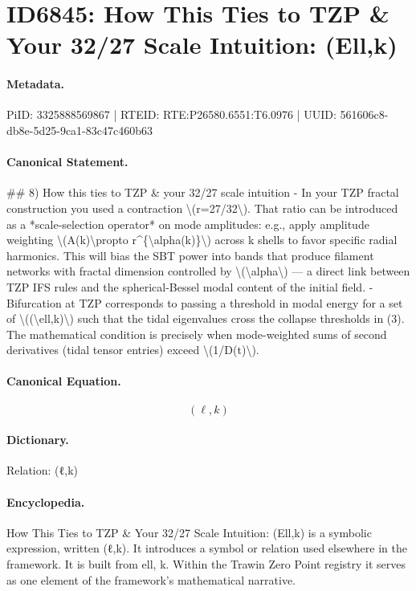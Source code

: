 \section*{ID6845: How This Ties to TZP \& Your 32/27 Scale Intuition: (Ell,k)}
\paragraph{Metadata.}
PiID: 3325888569867 | RTEID: RTE:P26580.6551:T6.0976 | UUID: 561606c8-db8e-5d25-9ca1-83c47c460b63

\paragraph{Canonical Statement.}
\#\# 8) How this ties to TZP \& your 32/27 scale intuition - In your TZP fractal construction you used a contraction \textbackslash{}(r=27/32\textbackslash{}). That ratio can be introduced as a *scale-selection operator* on mode amplitudes: e.g., apply amplitude weighting \textbackslash{}(A(k)\textbackslash{}propto r\textasciicircum{}\{\textbackslash{}alpha(k)\}\textbackslash{}) across k shells to favor specific radial harmonics. This will bias the SBT power into bands that produce filament networks with fractal dimension controlled by \textbackslash{}(\textbackslash{}alpha\textbackslash{}) — a direct link between TZP IFS rules and the spherical-Bessel modal content of the initial field. - Bifurcation at TZP corresponds to passing a threshold in modal energy for a set of \textbackslash{}((\textbackslash{}ell,k)\textbackslash{}) such that the tidal eigenvalues cross the collapse thresholds in (3). The mathematical condition is precisely when mode-weighted sums of second derivatives (tidal tensor entries) exceed \textbackslash{}(1/D(t)\textbackslash{}).

\paragraph{Canonical Equation.}
\[
(\ell,k)
\]

\paragraph{Dictionary.}
Relation: (ℓ,k)

\paragraph{Encyclopedia.}
How This Ties to TZP \& Your 32/27 Scale Intuition: (Ell,k) is a symbolic expression, written (ℓ,k). It introduces a symbol or relation used elsewhere in the framework. It is built from ell, k. Within the Trawin Zero Point registry it serves as one element of the framework's mathematical narrative.
